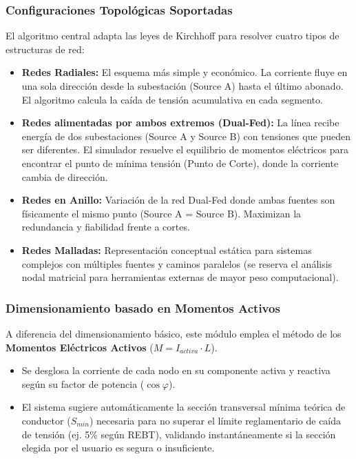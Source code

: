 \documentclass[11pt,a4paper]{article}
\begin{document}
\subsubsection{Configuraciones Topológicas Soportadas}
El algoritmo central adapta las leyes de Kirchhoff para resolver cuatro tipos de estructuras de red:
\begin{itemize}
    \item \textbf{Redes Radiales:} El esquema más simple y económico. La corriente fluye en una sola dirección desde la subestación (Source A) hasta el último abonado. El algoritmo calcula la caída de tensión acumulativa en cada segmento.
    \item \textbf{Redes alimentadas por ambos extremos (Dual-Fed):} La línea recibe energía de dos subestaciones (Source A y Source B) con tensiones que pueden ser diferentes. El simulador resuelve el equilibrio de momentos eléctricos para encontrar el punto de mínima tensión (Punto de Corte), donde la corriente cambia de dirección.
    \item \textbf{Redes en Anillo:} Variación de la red Dual-Fed donde ambas fuentes son físicamente el mismo punto (Source A = Source B). Maximizan la redundancia y fiabilidad frente a cortes.
    \item \textbf{Redes Malladas:} Representación conceptual estática para sistemas complejos con múltiples fuentes y caminos paralelos (se reserva el análisis nodal matricial para herramientas externas de mayor peso computacional).
\end{itemize}

\subsubsection{Dimensionamiento basado en Momentos Activos}
A diferencia del dimensionamiento básico, este módulo emplea el método de los \textbf{Momentos Eléctricos Activos} ($M = I_{activa} \cdot L$).
\begin{itemize}
    \item Se desglosa la corriente de cada nodo en su componente activa y reactiva según su factor de potencia ($\cos \varphi$).
    \item El sistema sugiere automáticamente la sección transversal mínima teórica de conductor ($S_{min}$) necesaria para no superar el límite reglamentario de caída de tensión (ej. 5\% según REBT), validando instantáneamente si la sección elegida por el usuario es segura o insuficiente.
\end{itemize}
\end{document}
